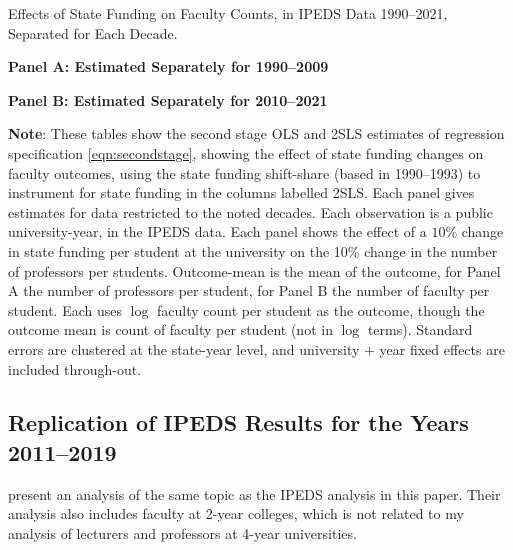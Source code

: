 \begin{table}[H]
    \singlespacing
    \centering
    \caption{Effects of State Funding on Faculty Counts, in IPEDS Data 1990--2021, Separated for Each Decade.}

    \textbf{Panel A: Estimated Separately for 1990--2009}

    \makebox[\textwidth][c]{
        }

    \textbf{Panel B: Estimated Separately for 2010--2021}

    \makebox[\textwidth][c]{
            }

    \label{tab:facultycount-replicated-corrected}
    \justify
    \footnotesize
    \textbf{Note}:
    These tables show the second stage OLS and 2SLS estimates of regression specification \eqref{eqn:secondstage}, showing the effect of state funding changes on faculty outcomes, using the state funding shift-share (based in 1990--1993) to instrument for state funding in the columns labelled 2SLS.
    Each panel gives estimates for data restricted to the noted decades.
    Each observation is a public university-year, in the IPEDS data.
    Each panel shows the effect of a $10$\% change in state funding per student at the university on the 10\% change in the number of professors per students.
    Outcome-mean is the mean of the outcome, for Panel A the number of professors per student, for Panel B the number of faculty per student.
    Each uses $\log$ faculty count per student as the outcome, though the outcome mean is count of faculty per student (not in $\log$ terms).
    Standard errors are clustered at the state-year level, and university $+$ year fixed effects are included through-out.
\end{table}


\newpage
\subsection{Replication of IPEDS Results for the Years 2011--2019}
\label{sec:recession-analysis}
\cite{hinrichs2022state} present an analysis of the same topic as the IPEDS analysis in this paper.
Their analysis also includes faculty at 2-year colleges, which is not related to my analysis of lecturers and professors at 4-year universities.

